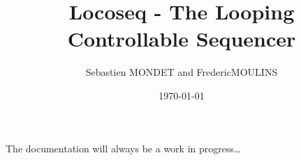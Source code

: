

\title{Locoseq - The Looping Controllable Sequencer}
\author{Sebastien MONDET and FredericMOULINS}

\date{\today}





\sffamily

\onecolumn
\maketitle
\tableofcontents
\twocolumn

The documentation will always be a work in progress\dots





